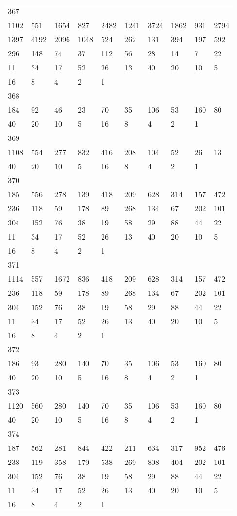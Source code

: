 \begin{longtable}{*{10}{l}}
367&&&&&&&&&\\
1102& 551& 1654& 827& 2482& 1241& 3724& 1862& 931& 2794\\
1397& 4192& 2096& 1048& 524& 262& 131& 394& 197& 592\\
296& 148& 74& 37& 112& 56& 28& 14& 7& 22\\
11& 34& 17& 52& 26& 13& 40& 20& 10& 5\\
16& 8& 4& 2& 1& \\

368&&&&&&&&&\\
184& 92& 46& 23& 70& 35& 106& 53& 160& 80\\
40& 20& 10& 5& 16& 8& 4& 2& 1& \\

369&&&&&&&&&\\
1108& 554& 277& 832& 416& 208& 104& 52& 26& 13\\
40& 20& 10& 5& 16& 8& 4& 2& 1& \\

370&&&&&&&&&\\
185& 556& 278& 139& 418& 209& 628& 314& 157& 472\\
236& 118& 59& 178& 89& 268& 134& 67& 202& 101\\
304& 152& 76& 38& 19& 58& 29& 88& 44& 22\\
11& 34& 17& 52& 26& 13& 40& 20& 10& 5\\
16& 8& 4& 2& 1& \\

371&&&&&&&&&\\
1114& 557& 1672& 836& 418& 209& 628& 314& 157& 472\\
236& 118& 59& 178& 89& 268& 134& 67& 202& 101\\
304& 152& 76& 38& 19& 58& 29& 88& 44& 22\\
11& 34& 17& 52& 26& 13& 40& 20& 10& 5\\
16& 8& 4& 2& 1& \\

372&&&&&&&&&\\
186& 93& 280& 140& 70& 35& 106& 53& 160& 80\\
40& 20& 10& 5& 16& 8& 4& 2& 1& \\

373&&&&&&&&&\\
1120& 560& 280& 140& 70& 35& 106& 53& 160& 80\\
40& 20& 10& 5& 16& 8& 4& 2& 1& \\

374&&&&&&&&&\\
187& 562& 281& 844& 422& 211& 634& 317& 952& 476\\
238& 119& 358& 179& 538& 269& 808& 404& 202& 101\\
304& 152& 76& 38& 19& 58& 29& 88& 44& 22\\
11& 34& 17& 52& 26& 13& 40& 20& 10& 5\\
16& 8& 4& 2& 1& \\


\end{longtable}
